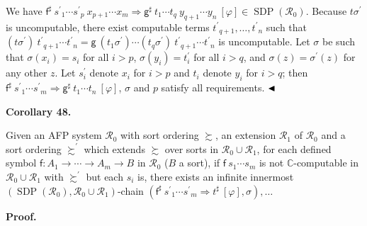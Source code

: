 We have ${{{\mathsf{f}^{\sharp}}\ {{s^{\prime}}_{1}\cdots{s^{\prime}}_{p}}}\ {{x}_{p+1}\cdots{x}_{m}}}\Rightarrow{{{\mathsf{g}^{\sharp}}\ {{t}_{1}\cdots{t}_{q}}}\ {{y}_{q+1}\cdots{y}_{n}}}\ [\varphi]\in\operatorname{SDP}(\mathcal{R}_{0})$. Because $t\sigma^{\prime}$ is uncomputable, there exist computable terms ${t^{\prime}}_{q+1},\ldots,{t^{\prime}}_{n}$ such that ${(t\sigma^{\prime})}\ {{t^{\prime}}_{q+1}\cdots{t^{\prime}}_{n}}={{\mathsf{g}}\ {(t_{1}\sigma^{\prime})\cdots(t_{q}\sigma^{\prime})}}\ {{t^{\prime}}_{q+1}\cdots{t^{\prime}}_{n}}$ is uncomputable. Let $\sigma$ be such that $\sigma(x_{i})=s_{i}$ for all $i>p$, $\sigma(y_{i})=t_{i}^{\prime}$ for all $i>q$, and $\sigma(z)=\sigma^{\prime}(z)$ for any other $z$. Let $s_{i}^{\prime}$ denote $x_{i}$ for $i>p$ and $t_{i}$ denote $y_{i}$ for $i>q$; then ${{\mathsf{f}^{\sharp}}\ {{s^{\prime}}_{1}\cdots{s^{\prime}}_{m}}}\Rightarrow{{\mathsf{g}^{\sharp}}\ {{t}_{1}\cdots{t}_{n}}}\ [\varphi]$, $\sigma$ and $p$ satisfy all requirements. $\hfill\blacktriangleleft$\par
 
 
 
\par\medskip\noindent\textbf{Corollary 48.}\par
 
 
Given an AFP system $\mathcal{R}_{0}$ with sort ordering $\succsim$, an extension $\mathcal{R}_{1}$ of $\mathcal{R}_{0}$ and a sort ordering $\succsim^{\prime}$ which extends $\succsim$ over sorts in $\mathcal{R}_{0}\cup\mathcal{R}_{1}$, for each defined symbol $\mathsf{f}:{A}_{1}\rightarrow\cdots\rightarrow{A}_{m}\rightarrow B$ in $\mathcal{R}_{0}$ ($B$ a sort), if ${\mathsf{f}}\ {{s}_{1}\cdots{s}_{m}}$ is not $\mathbb{C}$-computable in $\mathcal{R}_{0}\cup\mathcal{R}_{1}$ with $\succsim^{\prime}$ but each $s_{i}$ is, there exists an infinite innermost $(\operatorname{SDP}(\mathcal{R}_{0}),\mathcal{R}_{0}\cup\mathcal{R}_{1})$-chain $({{\mathsf{f}^{\sharp}}\ {{s^{\prime}}_{1}\cdots{s^{\prime}}_{m}}}\Rightarrow{t^{\sharp}}\ [\varphi],\sigma),\ldots$\par
 
 
 
 
 
\par\medskip\noindent\textbf{Proof.}\par
 
